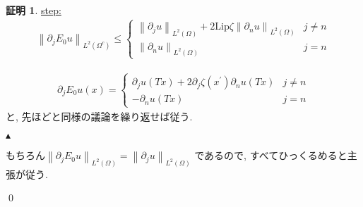 \documentclass[10pt, fleqn, label-section=none]{bxjsarticle}
\theoremstyle{definition}
\newtheorem*{pf*}{証明}
\newcommand{\norm}[1]{\left\|#1\right\|}
\newcommand{\Lip}{\textrm{Lip}}
\renewcommand{\;}{\, ; \,}
\newenvironment{claim}[1]{\par\noindent\underline{step:}\space#1}{}
\newenvironment{claimproof}[1]{\par\noindent{($\because$)}\space#1}{\hfill $\blacktriangle $}
\begin{document}
\begin{pf*}
\begin{claim}
\begin{align*} \norm{\partial_j E_0 u}_{L^2(\Omega^c)} \leq \begin{cases} \norm{\partial_j u}_{L^2(\Omega)} + 2 \Lip \zeta \norm{  \partial_n u }_{L^2(\Omega)}  &j \neq n  \\  \norm{\partial_n u}_{L^2(\Omega )} & j =n \end{cases} \end{align*}

\end{claim}
\begin{claimproof}

\begin{align*} \partial_j E_0 u (x) = \begin{cases} \partial_j u(Tx) + 2 \partial_j \zeta (x^\prime) \partial_n u(Tx)  &j \neq n  \\ - \partial_n u(Tx) & j =n \end{cases}        \end{align*}
と, 先ほどと同様の議論を繰り返せば従う. 

\end{claimproof} 

もちろん$\norm{\partial_j E_0 u}_{L^2(\Omega)} = \norm{\partial_j u}_{L^2(\Omega)}$ であるので, すべてひっくるめると主張が従う. 

\qed
\end{pf*}
\end{document}
